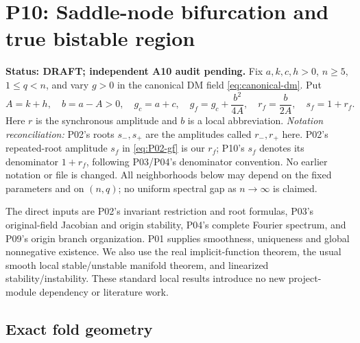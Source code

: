 \section{P10: Saddle-node bifurcation and true bistable region}
\label{sec:P10}

\noindent\textbf{Status: DRAFT; independent A10 audit pending.}
Fix $a,k,c,h>0$, $n\ge5$, $1\le q<n$, and vary $g>0$ in the
canonical DM field \eqref{eq:canonical-dm}. Put
\begin{equation}
 A=k+h,\quad b=a-A>0,\quad g_c=a+c,\quad
 g_f=g_c+\frac{b^2}{4A},\quad r_f=\frac b{2A},\quad s_f=1+r_f.
 \label{eq:P10-data}
\end{equation}
Here $r$ is the synchronous amplitude and $b$ is a local abbreviation.
\emph{Notation reconciliation:} P02's roots $s_-,s_+$ are the amplitudes
called $r_-,r_+$ here. P02's repeated-root amplitude $s_f$ in
\eqref{eq:P02-gf} is our $r_f$; P10's $s_f$ denotes its denominator
$1+r_f$, following P03/P04's denominator convention. No earlier notation
or file is changed. All neighborhoods below may depend on the fixed
parameters and on $(n,q)$; no uniform spectral gap as $n\to\infty$ is claimed.

The direct inputs are P02's invariant restriction and root formulas,
P03's original-field Jacobian and origin stability, P04's complete
Fourier spectrum, and P09's origin branch organization. P01 supplies
smoothness, uniqueness and global nonnegative existence. We also use
the real implicit-function theorem, the usual smooth local stable/unstable
manifold theorem, and linearized stability/instability. These standard
local results introduce no new project-module dependency or literature work.

\subsection{Exact fold geometry}
\label{slot:P10-1}

